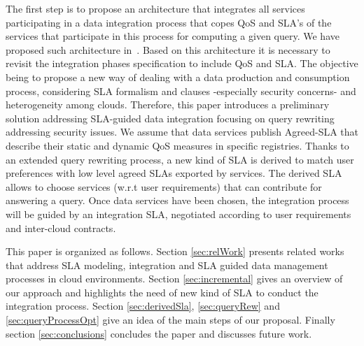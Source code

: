   The first step is to propose an architecture that integrates all services participating in a data integration process that copes QoS and SLA's of the services that participate in this process for computing a given query. 
  We have proposed such architecture in~\cite{BennaniGMV14}. Based on this architecture it is necessary to revisit  the integration phases  specification to include QoS and SLA. The objective being to  propose a new way of dealing with a data production and consumption process, considering SLA formalism and clauses -especially security concerns-  and heterogeneity among clouds. Therefore, this paper introduces a preliminary solution addressing SLA-guided data integration focusing  on query rewriting addressing security issues. We assume that data services publish Agreed-SLA that describe their  static and dynamic QoS measures in specific registries.  Thanks to an extended query rewriting process, a new kind of SLA is derived to match user preferences with low level agreed SLAs exported by services. The derived SLA allows to choose  services (w.r.t user requirements) that can contribute for answering a query. Once data services have been chosen, the integration process will be guided by an integration SLA, negotiated according to user requirements and inter-cloud contracts.

 
This paper is organized as follows. Section \ref{sec:relWork} presents related works that address SLA modeling, integration and SLA guided data management processes in cloud environments. Section \ref{sec:incremental} gives an overview of our approach and highlights the need of new kind of SLA to conduct the integration process. Section \ref{sec:derivedSla}, \ref{sec:queryRew} and \ref{sec:queryProcessOpt} give an idea of the main steps of our proposal.  Finally section  \ref{sec:conclusions} concludes the paper and discusses future work.









 